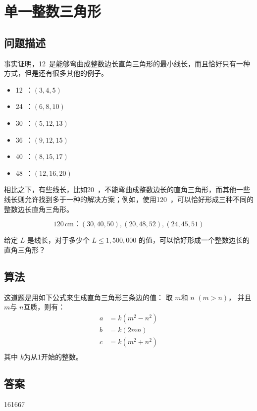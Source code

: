\section{单一整数三角形}
\subsection{问题描述}
\begin{tcolorbox}
	事实证明，12\,  是能够弯曲成整数边长直角三角形的最小线长，而且恰好只有一种方式，但是还有很多其他的例子。

	\begin{itemize}[itemsep=0pt]
		\item  12\, ：\((3, 4, 5)\)
		\item  24\, ：\((6, 8, 10)\)
		\item  30\, ：\((5, 12, 13)\)
		\item  36\, ：\((9, 12, 15)\)
		\item  40\, ：\((8, 15, 17)\)
		\item  48\, ：\((12, 16, 20)\)
	\end{itemize}

	相比之下，有些线长，比如20\, ，不能弯曲成整数边长的直角三角形，而其他一些线长则允许找到多于一种的解决方案；例如，使用120\, ，可以恰好形成三种不同的整数边长直角三角形。

	\begin{equation*}
		120\, \text{cm}：(30, 40, 50), (20, 48, 52), (24, 45, 51)
	\end{equation*}

	给定 \( L \) 是线长，对于多少个 \( L \leq 1,500,000 \) 的值，可以恰好形成一个整数边长的直角三角形？

\end{tcolorbox}

\subsection{算法}
这道题是用如下公式来生成直角三角形三条边的值：
取 \( m \)和 \( n \) \( (m > n) \)， 并且 \( m \)与 \( n \)互质，则有：
\begin{align*}
	a & = k(m^2 - n^2) \\
	b & = k(2mn)       \\
	c & = k(m^2 + n^2) \\
\end{align*}
其中 \( k \)为从1开始的整数。

\subsection{答案}
161667
